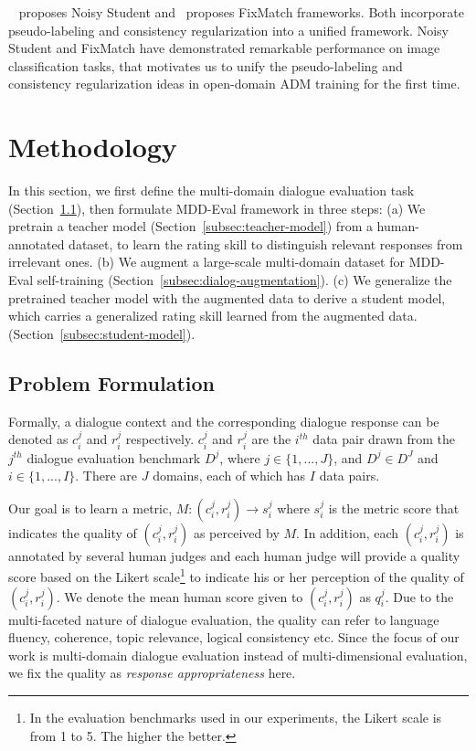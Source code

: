 \documentclass[letterpaper]{article} \usepackage{aaai22}  \usepackage{times}  \usepackage{helvet}  \usepackage{courier}  \usepackage[hyphens]{url}  \usepackage{graphicx} \urlstyle{rm} \def\UrlFont{\rm}  \usepackage{natbib}  \usepackage{caption} \DeclareCaptionStyle{ruled}{labelfont=normalfont,labelsep=colon,strut=off} \frenchspacing  \setlength{\pdfpagewidth}{8.5in}  \setlength{\pdfpageheight}{11in}  \usepackage{algorithm}
\begin{document}
~\citet{xie2020self} proposes Noisy Student and~\citet{sohn2020fixmatch} proposes FixMatch frameworks. Both incorporate pseudo-labeling and consistency regularization into a unified framework.  Noisy Student and FixMatch have demonstrated remarkable performance on image classification tasks, that motivates us to unify the pseudo-labeling and consistency regularization ideas in open-domain ADM training for the first time.















\section{Methodology}
\label{sec:method}
In this section, we first define the multi-domain dialogue evaluation task (Section~\ref{subsec:problem-formulation}), then formulate MDD-Eval framework in three steps: (a) We pretrain a teacher model (Section~\ref{subsec:teacher-model}) from a human-annotated dataset, to learn the rating skill to distinguish relevant responses from irrelevant ones. (b) We augment a large-scale multi-domain dataset for MDD-Eval self-training (Section~\ref{subsec:dialog-augmentation}). (c) We generalize the pretrained teacher model with the augmented data to derive a student model, which carries a generalized rating skill learned from the augmented data. (Section~\ref{subsec:student-model}). 

\subsection{Problem Formulation}
\label{subsec:problem-formulation}
Formally, a dialogue context and the corresponding dialogue response can be denoted as $c_i^j$ and $r_i^j$ respectively. $c_i^j$ and $r_i^j$ are the $i^{th}$ data pair drawn from the $j^{th}$ dialogue evaluation benchmark $D^j$, where $j\in\{1,...,J\}$, and $D^j \in D^J$ and $i\in\{1,...,I\}$. There are $J$ domains, each of which has $I$ data pairs. 



Our goal is to learn a metric, $M: (c_i^j, r_i^j) \rightarrow s_i^j$ where $s_i^j$ is the metric score that indicates the quality of $(c_i^j, r_i^j)$ as perceived by $M$. In addition, each $(c_i^j, r_i^j)$ is annotated by several human judges and each human judge will provide a quality score based on the Likert scale\footnote{In the evaluation benchmarks used in our experiments, the Likert scale is from 1 to 5. The higher the better.} to indicate his or her perception of the quality of $(c_i^j, r_i^j)$. We denote the mean human score given to $(c_i^j, r_i^j)$ as $q_i^j$. Due to the multi-faceted nature of dialogue evaluation, the quality can refer to language fluency, coherence, topic relevance, logical consistency etc. Since the focus of our work is multi-domain dialogue evaluation instead of multi-dimensional evaluation, we fix the quality as \textit{response appropriateness} here. 
\end{document}
